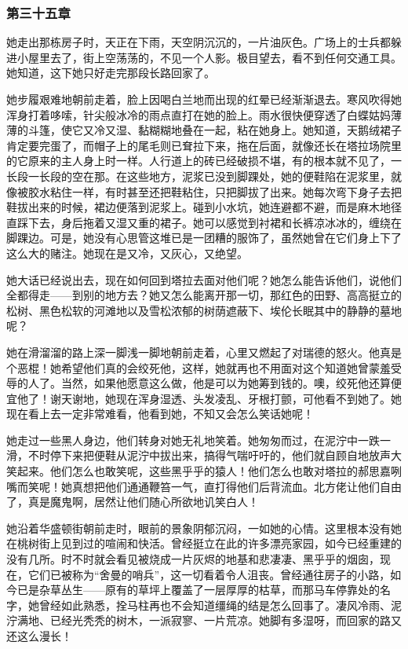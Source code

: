\subsubsection{第三十五章}

\par 她走出那栋房子时，天正在下雨，天空阴沉沉的，一片油灰色。广场上的士兵都躲进小屋里去了，街上空荡荡的，不见一个人影。极目望去，看不到任何交通工具。她知道，这下她只好走完那段长路回家了。
\par 她步履艰难地朝前走着，脸上因喝白兰地而出现的红晕已经渐渐退去。寒风吹得她浑身打着哆嗦，针尖般冰冷的雨点直打在她的脸上。雨水很快便穿透了白蝶姑妈薄薄的斗篷，使它又冷又湿、黏糊糊地叠在一起，粘在她身上。她知道，天鹅绒裙子肯定要完蛋了，而帽子上的尾毛则已耷拉下来，拖在后面，就像还长在塔拉场院里的它原来的主人身上时一样。人行道上的砖已经破损不堪，有的根本就不见了，一长段一长段的空在那。在这些地方，泥浆已没到脚踝处，她的便鞋陷在泥浆里，就像被胶水粘住一样，有时甚至还把鞋粘住，只把脚拔了出来。她每次弯下身子去把鞋拔出来的时候，裙边便落到泥浆上。碰到小水坑，她连避都不避，而是麻木地径直踩下去，身后拖着又湿又重的裙子。她可以感觉到衬裙和长裤凉冰冰的，缠绕在脚踝边。可是，她没有心思管这堆已是一团糟的服饰了，虽然她曾在它们身上下了这么大的赌注。她现在是又冷，又灰心，又绝望。
\par 她大话已经说出去，现在如何回到塔拉去面对他们呢？她怎么能告诉他们，说他们全都得走——到别的地方去？她又怎么能离开那一切，那红色的田野、高高挺立的松树、黑色松软的河滩地以及雪松浓郁的树荫遮蔽下、埃伦长眠其中的静静的墓地呢？
\par 她在滑溜溜的路上深一脚浅一脚地朝前走着，心里又燃起了对瑞德的怒火。他真是个恶棍！她希望他们真的会绞死他，这样，她就再也不用面对这个知道她曾蒙羞受辱的人了。当然，如果他愿意这么做，他是可以为她筹到钱的。噢，绞死他还算便宜他了！谢天谢地，她现在浑身湿透、头发凌乱、牙根打颤，可他看不到她了。她现在看上去一定非常难看，他看到她，不知又会怎么笑话她呢！
\par 她走过一些黑人身边，他们转身对她无礼地笑着。她匆匆而过，在泥泞中一跌一滑，不时停下来把便鞋从泥泞中拔出来，搞得气喘吁吁的，他们就自顾自地放声大笑起来。他们怎么也敢笑呢，这些黑乎乎的猿人！他们怎么也敢对塔拉的郝思嘉咧嘴而笑呢！她真想把他们通通鞭笞一气，直打得他们后背流血。北方佬让他们自由了，真是魔鬼啊，居然让他们随心所欲地讥笑白人！
\par 她沿着华盛顿街朝前走时，眼前的景象阴郁沉闷，一如她的心情。这里根本没有她在桃树街上见到过的喧闹和快活。曾经挺立在此的许多漂亮家园，如今已经重建的没有几所。时不时就会看见被烧成一片灰烬的地基和悲凄凄、黑乎乎的烟囱，现在，它们已被称为“舍曼的哨兵”，这一切看着令人沮丧。曾经通往房子的小路，如今已是杂草丛生——原有的草坪上覆盖了一层厚厚的枯草，而那马车停靠处的名字，她曾经如此熟悉，拴马柱再也不会知道缰绳的结是怎么回事了。凄风冷雨、泥泞满地、已经光秃秃的树木，一派寂寥、一片荒凉。她脚有多湿呀，而回家的路又还这么漫长！
